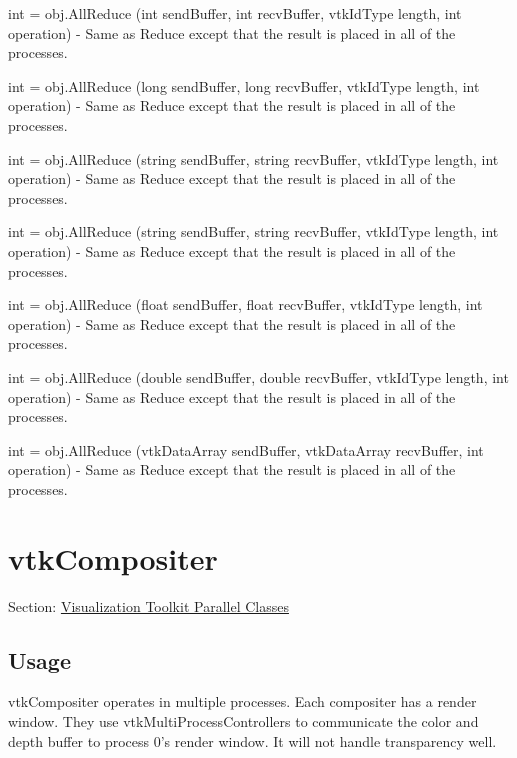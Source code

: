 \begin{DoxyItemize}
\item {\ttfamily int = obj.\-All\-Reduce (int send\-Buffer, int recv\-Buffer, vtk\-Id\-Type length, int operation)} -\/ Same as Reduce except that the result is placed in all of the processes.  
\item {\ttfamily int = obj.\-All\-Reduce (long send\-Buffer, long recv\-Buffer, vtk\-Id\-Type length, int operation)} -\/ Same as Reduce except that the result is placed in all of the processes.  
\item {\ttfamily int = obj.\-All\-Reduce (string send\-Buffer, string recv\-Buffer, vtk\-Id\-Type length, int operation)} -\/ Same as Reduce except that the result is placed in all of the processes.  
\item {\ttfamily int = obj.\-All\-Reduce (string send\-Buffer, string recv\-Buffer, vtk\-Id\-Type length, int operation)} -\/ Same as Reduce except that the result is placed in all of the processes.  
\item {\ttfamily int = obj.\-All\-Reduce (float send\-Buffer, float recv\-Buffer, vtk\-Id\-Type length, int operation)} -\/ Same as Reduce except that the result is placed in all of the processes.  
\item {\ttfamily int = obj.\-All\-Reduce (double send\-Buffer, double recv\-Buffer, vtk\-Id\-Type length, int operation)} -\/ Same as Reduce except that the result is placed in all of the processes.  
\item {\ttfamily int = obj.\-All\-Reduce (vtk\-Data\-Array send\-Buffer, vtk\-Data\-Array recv\-Buffer, int operation)} -\/ Same as Reduce except that the result is placed in all of the processes.  
\end{DoxyItemize}\hypertarget{vtkparallel_vtkcompositer}{}\section{vtk\-Compositer}\label{vtkparallel_vtkcompositer}
Section\-: \hyperlink{sec_vtkparallel}{Visualization Toolkit Parallel Classes} \hypertarget{vtkwidgets_vtkxyplotwidget_Usage}{}\subsection{Usage}\label{vtkwidgets_vtkxyplotwidget_Usage}
vtk\-Compositer operates in multiple processes. Each compositer has a render window. They use vtk\-Multi\-Process\-Controllers to communicate the color and depth buffer to process 0's render window. It will not handle transparency well.

